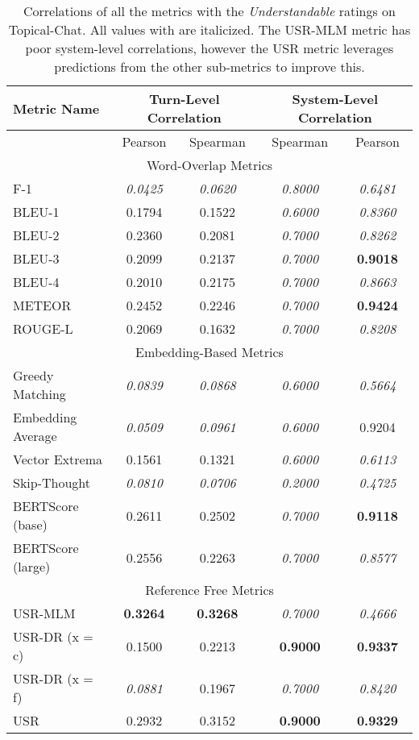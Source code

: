 \documentclass[11pt,a4paper]{article}
\begin{document}
\begin{table*}
    \centering
    \renewcommand*{\arraystretch}{1.2}
    \begin{tabular}{|l|c|c|c|c|}
    \hline
        \textbf{Metric Name} & \multicolumn{2}{|c|}{\textbf{Turn-Level Correlation}} & \multicolumn{2}{|c|}{\textbf{System-Level Correlation}}  \\ \hline
         & Pearson & Spearman & Spearman & Pearson \\ \hline
         \multicolumn{5}{|c|}{Word-Overlap Metrics} \\ \hline
F-1 & \textit{0.0425} & \textit{0.0620} & \textit{0.8000} & \textit{0.6481} \\
BLEU-1 & 0.1794 & 0.1522 & \textit{0.6000} & \textit{0.8360} \\
BLEU-2 & 0.2360 & 0.2081 & \textit{0.7000} & \textit{0.8262} \\
BLEU-3 & 0.2099 & 0.2137 & \textit{0.7000} & \textbf{0.9018} \\
BLEU-4 & 0.2010 & 0.2175 & \textit{0.7000} & \textit{0.8663} \\
METEOR & 0.2452 & 0.2246 & \textit{0.7000} & \textbf{0.9424} \\
ROUGE-L & 0.2069 & 0.1632 & \textit{0.7000} & \textit{0.8208} \\ \hline
\multicolumn{5}{|c|}{Embedding-Based Metrics} \\ \hline
Greedy Matching & \textit{0.0839} & \textit{0.0868} & \textit{0.6000} & \textit{0.5664} \\
Embedding Average & \textit{0.0509} & \textit{0.0961} & \textit{0.6000} & 0.9204 \\
Vector Extrema & 0.1561 & 0.1321 & \textit{0.6000} & \textit{0.6113} \\
Skip-Thought & \textit{0.0810} & \textit{0.0706} & \textit{0.2000} & \textit{0.4725} \\
BERTScore (base) & 0.2611 & 0.2502 & \textit{0.7000} & \textbf{0.9118} \\
BERTScore (large) & 0.2556 & 0.2263 & \textit{0.7000} & \textit{0.8577} \\ \hline
\multicolumn{5}{|c|}{Reference Free Metrics} \\ \hline
USR-MLM & \textbf{0.3264} & \textbf{0.3268} & \textit{0.7000} & \textit{0.4666} \\
USR-DR (x = c) & 0.1500 & 0.2213 & \textbf{0.9000} & \textbf{0.9337} \\
USR-DR (x = f) & \textit{0.0881} & 0.1967 & \textit{0.7000} & \textit{0.8420} \\
USR & 0.2932 & 0.3152 & \textbf{0.9000} & \textbf{0.9329} \\ \hline
    \end{tabular}
    \caption{Correlations of all the metrics with the \textit{Understandable} ratings on Topical-Chat. All values with  are italicized. The USR-MLM metric has poor system-level correlations, however the USR metric leverages predictions from the other sub-metrics to improve this.}
    
\end{table*}
\end{document}
